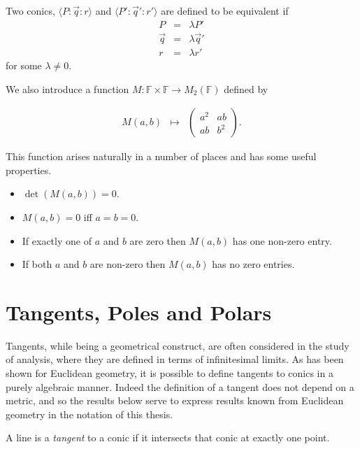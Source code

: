 \begin{definition} Two conics, $\langle P\!:\!\vec{q}\!:\!r \rangle$ and $\langle P'\!:\!\vec{q}'\!:\!r' \rangle$ are defined to be equivalent if
\begin{eqnarray}
P & = & \lambda P'\\
\vec{q} & = & \lambda\vec{q}'\\
r & = & \lambda r'
\end{eqnarray}
for some $\lambda \neq 0$.
\end{definition}

We also introduce a function $M : \mathbb{F} \times \mathbb{F} \to M_2(\mathbb{F})$ defined by

\begin{eqnarray}
M(a, b) & \mapsto & \begin{pmatrix} a^2 & ab \\ ab & b^2 \end{pmatrix}.
\end{eqnarray}

This function arises naturally in a number of places and has some useful properties.
\begin{itemize}
\item $\det(M(a, b)) = 0$.
\item $M(a, b) = 0$ iff $a = b = 0$.
\item If exactly one of $a$ and $b$ are zero then $M(a, b)$ has one non-zero entry.
\item If both $a$ and $b$ are non-zero then $M(a, b)$ has no zero entries.
\end{itemize}

\section{Tangents, Poles and Polars}

Tangents, while being a geometrical construct, are often considered in the study of analysis, where they are defined in terms of infinitesimal limits.
As has been shown for Euclidean geometry, it is possible to define tangents to conics in a purely algebraic manner\cite{thebook}.
Indeed the definition of a tangent does not depend on a metric, and so the results below serve to express results known from Euclidean geometry in the notation of this thesis.

\begin{definition} A line is a \emph{tangent} to a conic if it intersects that conic at exactly one point.
\end{definition}

